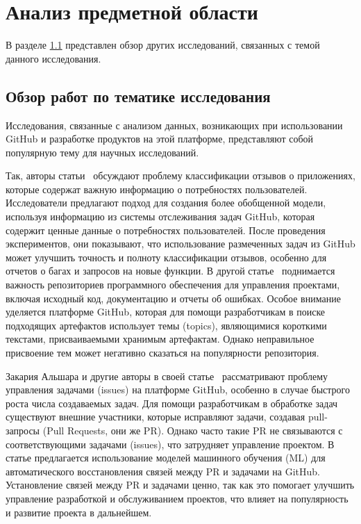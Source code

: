 \newpage
\section{Анализ предметной области}
\label{sec:Background}
В разделе \hyperref[subsec:Rewiev]{1.1} представлен обзор других исследований, связанных с темой данного исследования.
\subsection{Обзор работ по тематике исследования}
\label{subsec:Rewiev}
Исследования, связанные с анализом данных, возникающих при использовании GitHub и разработке продуктов на этой платформе, представляют собой популярную тему для научных исследований.

Так, авторы статьи~\cite{abs-2308-14211} обсуждают проблему классификации отзывов о приложениях, которые содержат важную информацию о потребностях пользователей. Исследователи предлагают подход для создания более обобщенной модели, используя информацию из системы отслеживания задач GitHub, которая содержит ценные данные о потребностях пользователей. После проведения экспериментов, они показывают, что использование размеченных задач из GitHub может улучшить точность и полноту классификации отзывов, особенно для отчетов о багах и запросов на новые функции. В другой статье~\cite{RoccoRSNR23} поднимается важность репозиториев программного обеспечения для управления проектами, включая исходный код, документацию и отчеты об ошибках. Особое внимание уделяется платформе GitHub, которая для помощи разработчикам в поиске подходящих артефактов использует темы (topics), являющимися короткими текстами, присваиваемыми хранимым артефактам. Однако неправильное присвоение тем может негативно сказаться на популярности репозитория. 

Закария Альшара и другие авторы в своей статье~\cite{AlsharaSSS23} рассматривают проблему управления задачами (issues) на платформе GitHub, особенно в случае быстрого роста числа создаваемых задач. Для помощи разработчикам в обработке задач существуют внешние участники, которые исправляют задачи, создавая pull-запросы (Pull Requests, они же PR). Однако часто такие PR не связываются с соответствующими задачами (issues), что затрудняет управление проектом. В статье предлагается использование моделей машинного обучения (ML) для автоматического восстановления связей между PR и задачами на GitHub. Установление связей между PR и задачами ценно, так как это помогает улучшить управление разработкой и обслуживанием проектов, что влияет на популярность и развитие проекта в дальнейшем.

